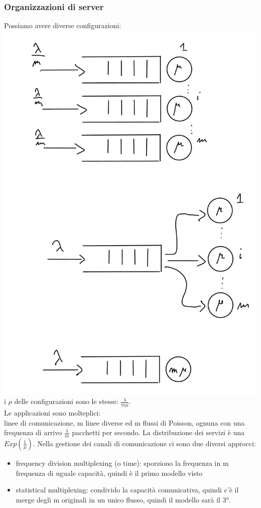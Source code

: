 \documentclass{article}
\begin{document}
\subsubsection{Organizzazioni di server} 
Possiamo avere diverse configurazioni:\\
\includegraphics[scale=0.3]{images/PMCSN-1803.jpeg}\\
i $\rho$ delle configurazioni sono le stesse: $\frac{\lambda}{m \mu}$.\\ Le applicazioni sono molteplici:
\\ linee di comunicazione, m linee diverse ed m flussi di Poisson, ognuna con una frequenza di arrivo $\frac{\lambda}{m}$ pacchetti per secondo. La distribuzione dei servizi è una $Exp(\frac{1}{\mu})$. Nella gestione dei canali di comunicazione ci sono due diversi approcci:
\begin{itemize}
\item frequency division multiplexing (o time): sporziono la frequenza in m frequenza di uguale capacità, quindi è il primo modello visto
\item statistical multiplexing: condivido la capacità comunicativa, quindi c'è il merge degli m originali in un unico flusso, quindi il modello sarà il 3°.
\end{itemize}
\end{document}
